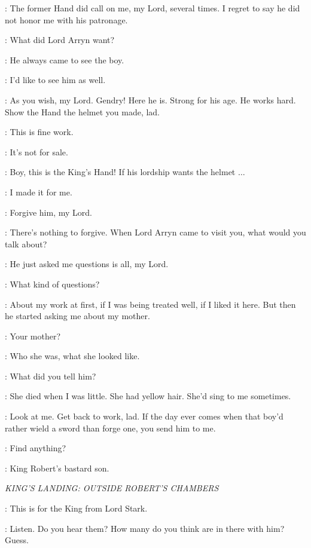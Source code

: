 \TOBHOMOTT: The former Hand did call on me, my Lord, several times. I regret to say he did not honor me with his patronage. 

\NED: What did Lord Arryn want? 

\TOBHOMOTT: He always came to see the boy. 

\NED: I'd like to see him as well. 

\TOBHOMOTT: As you wish, my Lord. Gendry! Here he is. Strong for his age. He works hard. Show the Hand the helmet you made, lad. 

\NED: This is fine work. 

\GENDRY: It's not for sale. 

\TOBHOMOTT: Boy, this is the King's Hand! If his lordship wants the helmet $\ldots$ 

\GENDRY: I made it for me. 

\TOBHOMOTT: Forgive him, my Lord. 

\NED: There's nothing to forgive. When Lord Arryn came to visit you, what would you talk about? 

\GENDRY: He just asked me questions is all, my Lord. 

\NED: What kind of questions? 

\GENDRY: About my work at first, if I was being treated well, if I liked it here. But then he started asking me about my mother. 

\NED: Your mother? 

\GENDRY: Who she was, what she looked like. 

\NED: What did you tell him? 

\GENDRY: She died when I was little. She had yellow hair. She'd sing to me sometimes. 

\NED: Look at me. Get back to work, lad. If the day ever comes when that boy'd rather wield a sword than forge one, you send him to me. 


\JORY: Find anything? 

\NED: King Robert's bastard son. 

\scene

\textit{KING'S LANDING: OUTSIDE ROBERT'S CHAMBERS}


\JORY: This is for the King from Lord Stark. 

\JAIME: Listen. Do you hear them? How many do you think are in there with him? Guess. 

